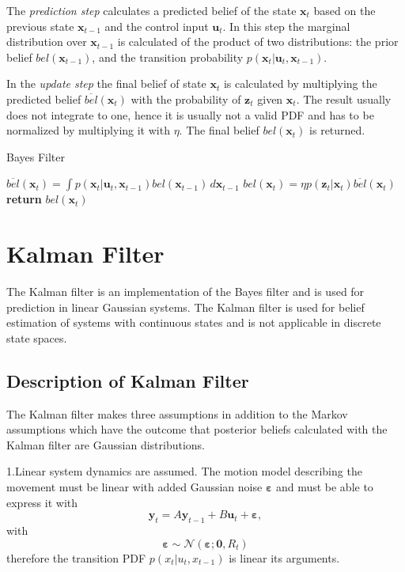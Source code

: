 \documentclass[12pt,oneside,openany,a4paper, %
afrikaans,english,
]{memoir}
\numberwithin{equation}{chapter}
\begin{document}
The \textit{prediction step} calculates a predicted belief of the state $\bm{x}_t$ based on the previous state $\bm{x}_{t-1}$ and the control input $\bm{u}_t$. In this step the marginal distribution over $\bm{x}_{t-1}$ is calculated of the product of two distributions: the prior belief $bel(\bm{x}_{t-1})$, and the  transition probability $p(\bm{x}_t|\bm{u}_t,\bm{x}_{t-1})$.

In the \textit{update step} the final belief of state $\bm{x}_t$ is calculated by multiplying the predicted belief $\overline{bel}(\bm{x}_t)$ with the probability of $\bm{z}_t$ given $\bm{x}_t$. The result usually does not integrate to one, hence it is usually not a valid PDF and has to be normalized by multiplying it with $\eta$. The final belief $bel(\bm{x}_t)$ is returned.
\begin{algorithm}
\caption{Bayes Filter}\label{bayesAlg}
\begin{algorithmic}[1]
\State $\overline{bel}(\bm{x}_t) = \int p(\bm{x}_t|\bm{u}_t, \bm{x}_{t-1})bel(\bm{x}_{t-1})\, d\bm{x}_{t-1}$
\State $bel(\bm{x}_t) = \eta p(\bm{z}_t|\bm{x}_t) \overline{bel} (\bm{x}_t)$
\EndFor
\State \textbf{return} $bel(\bm{x}_t)$
\EndProcedure
\end{algorithmic}
\end{algorithm}

\section{Kalman Filter}
The Kalman filter is an implementation of the Bayes filter and is used for prediction in linear Gaussian systems. The Kalman filter is used for belief estimation of systems with continuous states and is not applicable in discrete state spaces. 
\subsection{Description of Kalman Filter}
The Kalman filter makes three assumptions in addition to the Markov assumptions which have the outcome that posterior beliefs calculated with the Kalman filter are Gaussian distributions.

1.Linear system dynamics are assumed. The motion model describing the movement must be linear with added Gaussian noise $\bm{\varepsilon}$ and must be able to express it with 
\begin{equation}\label{eq:linearKmm}
\bm{y}_t = A \bm{y}_{t - 1} + B \bm{u}_t + \bm{\varepsilon},
\end{equation}
with 
\begin{equation}
\bm{\varepsilon} \sim \mathcal{N}(\bm{\varepsilon}; \bm{0}, R_t)
\end{equation}
therefore the transition PDF $p(x_t|u_t, x_{t-1})$ is linear its arguments.
\end{document}
